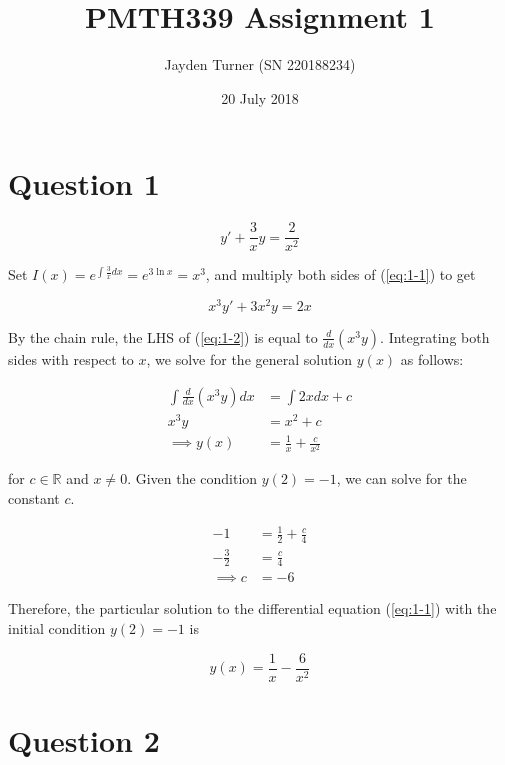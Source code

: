 \documentclass{article}
\title{PMTH339 Assignment 1}
\date{20 July 2018}
\author{Jayden Turner (SN 220188234)}
\begin{document}
\maketitle
{}

\section*{Question 1}

\begin{equation} \label{eq:1-1}
    y' + \frac{3}{x}y = \frac{2}{x^2}
\end{equation}

Set $I(x) = e^{\int \frac{3}{x}dx} = e^{3\ln x} = x^3$, and multiply both sides of (\ref{eq:1-1}) to get

\begin{equation} \label{eq:1-2}
    x^3y' + 3x^2y = 2x
\end{equation}

By the chain rule, the LHS of (\ref{eq:1-2}) is equal to $\frac{d}{dx}(x^3y)$. Integrating both sides with respect to $x$, we solve for
the general solution $y(x)$ as follows:

\begin{align}
    \int \frac{d}{dx}(x^3y) dx &= \int 2x dx + c \nonumber \\
    x^3y &= x^2 + c \nonumber \\
    \implies y(x) &= \frac{1}{x} + \frac{c}{x^2} \label{eq:1-3}
\end{align}

for $c \in \mathbb{R}$ and $x \neq 0$. Given the condition $y(2) = -1$, we can solve for the constant $c$.

\begin{align*}
    -1 &= \frac{1}{2} + \frac{c}{4}\\
    -\frac{3}{2} &= \frac{c}{4}\\
    \implies c &= -6
\end{align*}

Therefore, the particular solution to the differential equation (\ref{eq:1-1}) with the initial condition $y(2) = -1$ is

\begin{equation*}
    y(x) = \frac{1}{x} - \frac{6}{x^2}
\end{equation*}

\section*{Question 2}
\end{document}
